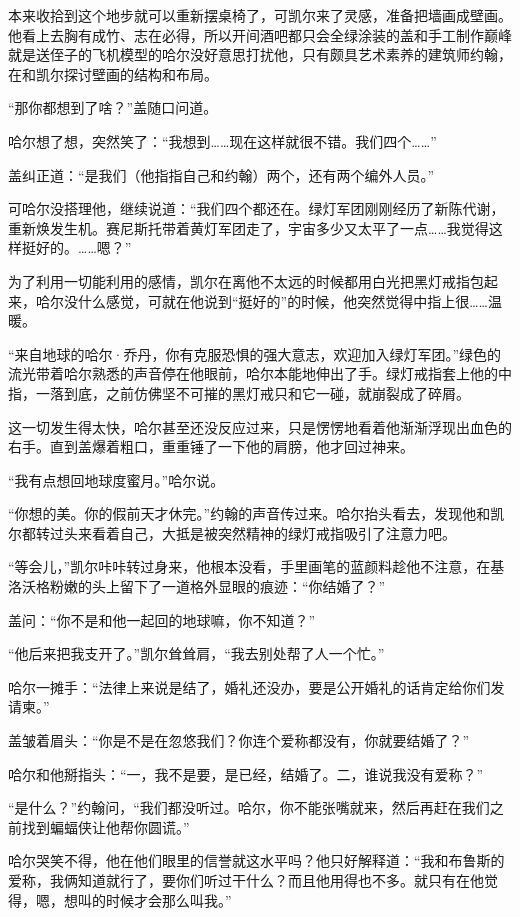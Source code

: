 \documentclass[../main]{subfiles}
\begin{document}
本来收拾到这个地步就可以重新摆桌椅了，可凯尔来了灵感，准备把墙画成壁画。他看上去胸有成竹、志在必得，所以开间酒吧都只会全绿涂装的盖和手工制作巅峰就是送侄子的飞机模型的哈尔没好意思打扰他，只有颇具艺术素养的建筑师约翰，在和凯尔探讨壁画的结构和布局。

“那你都想到了啥？”盖随口问道。

哈尔想了想，突然笑了：“我想到……现在这样就很不错。我们四个……”

盖纠正道：“是我们（他指指自己和约翰）两个，还有两个编外人员。”

可哈尔没搭理他，继续说道：“我们四个都还在。绿灯军团刚刚经历了新陈代谢，重新焕发生机。赛尼斯托带着黄灯军团走了，宇宙多少又太平了一点……我觉得这样挺好的。……嗯？”

为了利用一切能利用的感情，凯尔在离他不太远的时候都用白光把黑灯戒指包起来，哈尔没什么感觉，可就在他说到“挺好的”的时候，他突然觉得中指上很……温暖。

“来自地球的哈尔·乔丹，你有克服恐惧的强大意志，欢迎加入绿灯军团。”绿色的流光带着哈尔熟悉的声音停在他眼前，哈尔本能地伸出了手。绿灯戒指套上他的中指，一落到底，之前仿佛坚不可摧的黑灯戒只和它一碰，就崩裂成了碎屑。

这一切发生得太快，哈尔甚至还没反应过来，只是愣愣地看着他渐渐浮现出血色的右手。直到盖爆着粗口，重重锤了一下他的肩膀，他才回过神来。

“我有点想回地球度蜜月。”哈尔说。

“你想的美。你的假前天才休完。”约翰的声音传过来。哈尔抬头看去，发现他和凯尔都转过头来看着自己，大抵是被突然精神的绿灯戒指吸引了注意力吧。

“等会儿，”凯尔咔咔转过身来，他根本没看，手里画笔的蓝颜料趁他不注意，在基洛沃格粉嫩的头上留下了一道格外显眼的痕迹：“你结婚了？”

盖问：“你不是和他一起回的地球嘛，你不知道？”

“他后来把我支开了。”凯尔耸耸肩，“我去别处帮了人一个忙。”

哈尔一摊手：“法律上来说是结了，婚礼还没办，要是公开婚礼的话肯定给你们发请柬。”

盖皱着眉头：“你是不是在忽悠我们？你连个爱称都没有，你就要结婚了？”

哈尔和他掰指头：“一，我不是要，是已经，结婚了。二，谁说我没有爱称？”

“是什么？”约翰问，“我们都没听过。哈尔，你不能张嘴就来，然后再赶在我们之前找到蝙蝠侠让他帮你圆谎。”

哈尔哭笑不得，他在他们眼里的信誉就这水平吗？他只好解释道：“我和布鲁斯的爱称，我俩知道就行了，要你们听过干什么？而且他用得也不多。就只有在他觉得，嗯，想叫的时候才会那么叫我。”
\end{document}
